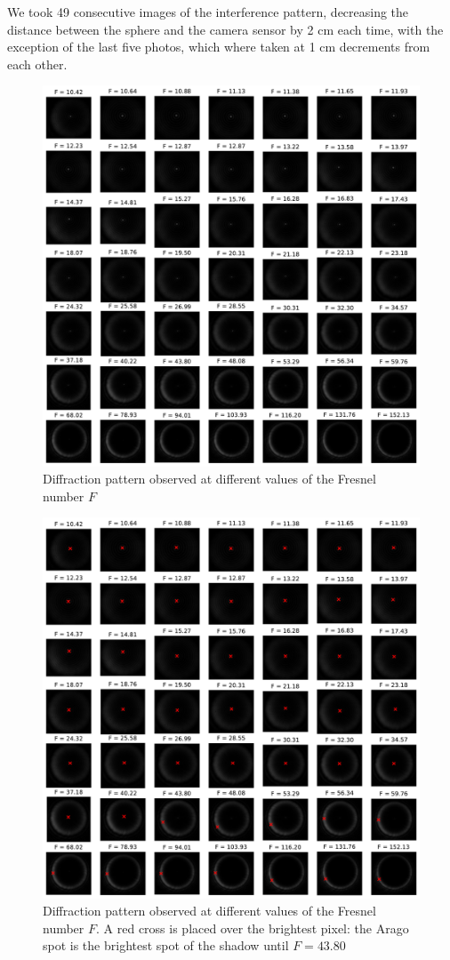 \documentclass[11pt,a4paper]{article}
\begin{document}
We took 49 consecutive images of the interference pattern, decreasing the distance between the sphere and the camera sensor by 2 cm each time, with the exception of the last five photos, which where taken at 1 cm decrements from each other.

\begin{figure}[H]
    \centering
    \includegraphics[width=0.8\linewidth]{1 - Arago Spot/Images/Fresnel-grid.pdf}
    \caption{Diffraction pattern observed at different values of the Fresnel number $F$}
    \label{fig:fresnel-number-grid}
\end{figure}

\begin{figure}[H]
    \centering
    \includegraphics[width=0.35\linewidth]{1 - Arago Spot/Images/Fresnel-grid-brightest-spot.pdf}
    \caption{Diffraction pattern observed at different values of the Fresnel number $F$. A red cross is placed over the brightest pixel: the Arago spot is the brightest spot of the shadow until $F = 43.80 $}
    \label{fig:fresnel-grid-highlighted-spot}
\end{figure}
\end{document}
